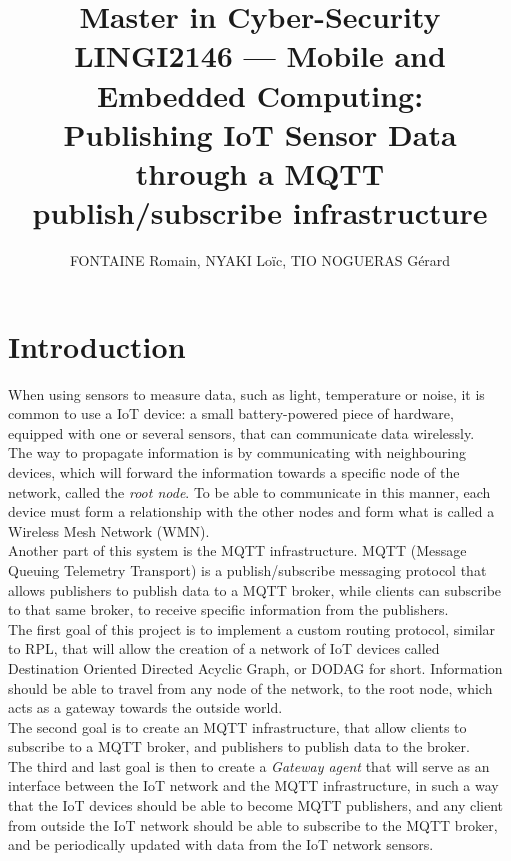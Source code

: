 \documentclass[a4paper,11pt]{article}
\title{Master in Cyber-Security\\
	LINGI2146 --- Mobile and Embedded Computing: \\
	Publishing IoT Sensor Data through a MQTT publish/subscribe infrastructure}
\author{FONTAINE Romain, NYAKI Loïc, TIO NOGUERAS Gérard}
\begin{document}
\maketitle
\newpage
\tableofcontents

\newpage

\section{Introduction}
When using sensors to measure data, such as light, temperature or noise, it is common to use a IoT device: a small battery-powered piece of hardware, equipped with one or several sensors, that can communicate data wirelessly.\\

The way to propagate information is by communicating with neighbouring devices, which will forward the information towards a specific node of the network, called the \textit{root node}. To be able to communicate in this manner, each device must form a relationship with the other nodes and form what is called a Wireless Mesh Network (WMN).\\

Another part of this system is the MQTT infrastructure. MQTT (Message Queuing Telemetry Transport) is a publish/subscribe messaging protocol that allows publishers to publish data to a MQTT broker, while clients can subscribe to that same broker, to receive specific information from the publishers.\\

The first goal of this project is to implement a custom routing protocol, similar to RPL,  that will allow the creation of a network of IoT devices called  Destination Oriented Directed Acyclic Graph, or DODAG for short. Information should be able to travel from any node of the network, to the root node, which acts as a gateway towards the outside world. \\

The second goal is to create an MQTT infrastructure, that allow clients to subscribe to a MQTT broker, and publishers to publish data to the broker.\\

The third and last goal is then to create a \textit{Gateway agent} that will serve as an interface between the IoT network and the MQTT infrastructure, in such a way that the IoT devices should be able to become MQTT publishers, and any client from outside the IoT network should be able to subscribe to the MQTT broker, and be periodically updated with data from the IoT network sensors.
\end{document}
